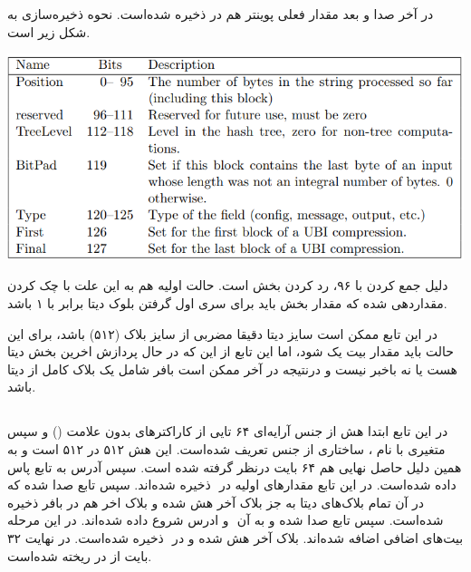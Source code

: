 در آخر \hyperref[subsec:WRITE-STATE-BIG]{}
صدا و بعد مقدار فعلی پوینتر هم در  ذخیره شده‌است.
نحوه ذخیره‌سازی  به شکل زیر است.
\begin{center}
	\includegraphics[width=14cm]{images/GoldenModelDocumentation/tweak.png}
\end{center}

دلیل جمع کردن  با ۹۶،‌ رد کردن بخش  است. حالت اولیه  هم به این علت با چک کردن  مقداردهی شده که مقدار بخش  باید برای سری اول گرفتن بلوک دیتا برابر با ۱ باشد.

در این تابع ممکن است سایز دیتا دقیقا مضربی از سایز بلاک (۵۱۲) باشد،‌ برای این حالت باید مقدار بیت  یک شود، اما این تابع از این که در حال پردازش اخرین بخش دیتا هست یا نه باخبر نیست و درنتیجه در‌ آخر ممکن است بافر شامل یک بلاک کامل از دیتا باشد.



\subsection{}
\label{subsec:skein-hash}


در این تابع ابتدا هش از جنس آرایه‌ای ۶۴ تایی از کاراکتر‌های بدون علامت () و سپس متغیری با نام ، ساختاری از جنس  
 \hyperref[subsec:sph-skein-big-context]{} 
 تعریف شده‌است. این هش ۵۱۲ در ۵۱۲ است و به همین دلیل حاصل نهایی هم ۶۴ بایت درنظر گرفته شده است. سپس آدرس  به تابع\hyperref[subsec:sph-skein512-init]{} پاس داده شده‌است. در این تابع مقدارهای اولیه در ‌ ذخیره شده‌اند. سپس تابع \hyperref[subsec:sph-skein512]{} صدا شده که در آن تمام بلاک‌های دیتا به جز بلاک آخر هش شده و بلاک ‌اخر هم در بافر ذخیره شده‌است. سپس تابع  \hyperref[subsec:sph-skein512-close]{} صدا شده و به آن ‌ و ادرس شروع  داده شده‌اند. در این مرحله بیت‌های اضافی اضافه شده‌اند. بلاک ‌آخر هش شده و در ‌ ذخیره شده‌است.
در نهایت ۳۲ بایت از  در  ریخته شده‌است.



